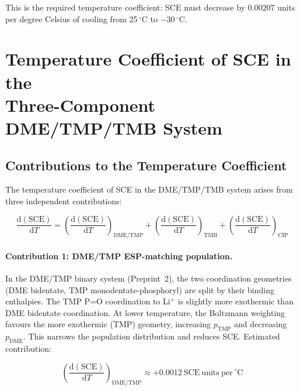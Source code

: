 \documentclass[11pt]{article}
\theoremstyle{plain}
\theoremstyle{definition}
\theoremstyle{remark}
\begin{document}
This is the required temperature coefficient: SCE must decrease by
$0.00207$ units per degree Celsius of cooling from 25\,$^\circ$C
to $-30\,^\circ$C.

\section{Temperature Coefficient of SCE in the\\
Three-Component DME/TMP/TMB System}
\label{sec:temperature_coefficient}

\subsection{Contributions to the Temperature Coefficient}

The temperature coefficient of SCE in the DME/TMP/TMB system
arises from three independent contributions:

\begin{equation}
  \frac{\mathrm{d}(\mathrm{SCE})}{\mathrm{d}T} =
  \left(\frac{\mathrm{d}(\mathrm{SCE})}{\mathrm{d}T}\right)_\mathrm{DME/TMP}
  + \left(\frac{\mathrm{d}(\mathrm{SCE})}{\mathrm{d}T}\right)_\mathrm{TMB}
  + \left(\frac{\mathrm{d}(\mathrm{SCE})}{\mathrm{d}T}\right)_\mathrm{CIP}
  \label{eq:total_coeff}
\end{equation}

\paragraph{Contribution 1: DME/TMP ESP-matching population.}

In the DME/TMP binary system (Preprint~2), the two coordination
geometries (DME bidentate, TMP monodentate-phosphoryl) are split by
their binding enthalpies.  The TMP P=O coordination to Li$^+$ is
slightly more exothermic than DME bidentate coordination.  At lower
temperature, the Boltzmann weighting favours the more exothermic
(TMP) geometry, increasing $p_\mathrm{TMP}$ and decreasing
$p_\mathrm{DME}$.  This narrows the population distribution and
reduces SCE.  Estimated contribution:

\begin{equation}
  \left(\frac{\mathrm{d}(\mathrm{SCE})}{\mathrm{d}T}
  \right)_\mathrm{DME/TMP} \approx +0.0012~\mathrm{SCE~units~per~}
  ^\circ\mathrm{C}
  \label{eq:coeff_DME_TMP}
\end{equation}
\end{document}
